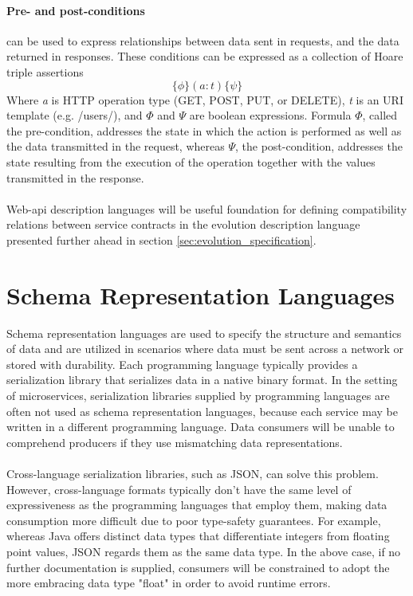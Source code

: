 \paragraph{Pre- and post-conditions} can be used to express relationships between data sent in
requests, and the data returned in responses. These conditions can be expressed as a collection of Hoare triple assertions
\[ \{\phi\} (a : t) \{\psi\} \]
Where \emph{a} is HTTP operation type (GET, POST, PUT, or DELETE), \emph{t} is an URI template (e.g. /users/), and $\Phi$ and $\Psi$ are boolean expressions.
Formula $\Phi$, called the pre-condition, addresses the state in which the action is performed as well as the data transmitted in the request,
whereas $\Psi$, the post-condition, addresses the state resulting from the execution of the operation together with the values transmitted in the response.

\paragraph{}

Web-api description languages will be useful foundation for defining compatibility relations between service contracts in the evolution description language
presented further ahead in section \ref{sec:evolution_specification}.

\section{Schema Representation Languages} %
\label{sec:schema_representation_languages}

Schema representation languages are used to specify the structure and semantics of data and are utilized in scenarios where data must be sent across a network or stored with durability.
Each programming language typically provides a serialization library that serializes data in a native binary format.
In the setting of microservices, serialization libraries supplied by programming languages are often not used as schema representation languages,
because each service may be written in a different programming language.
Data consumers will be unable to comprehend producers if they use mismatching data representations.

\paragraph{}

Cross-language serialization libraries, such as JSON, can solve this problem.
However, cross-language formats typically don't have the same level of expressiveness as the programming languages that employ them,
making data consumption more difficult due to poor type-safety guarantees.
For example, whereas Java offers distinct data types that differentiate integers from floating point values, JSON regards them as the same data type.
In the above case, if no further documentation is supplied, consumers will be constrained to adopt the more embracing data type "float" in order to avoid runtime errors.

